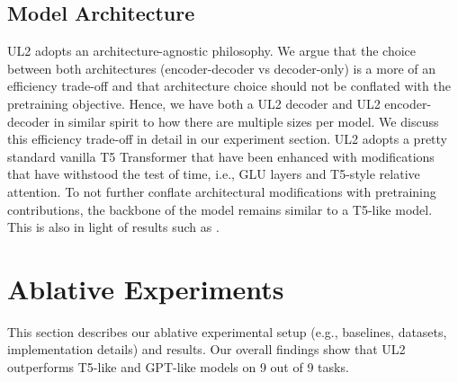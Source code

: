 \documentclass[10pt]{article}
\begin{document}
\subsection{Model Architecture}
UL2 adopts an architecture-agnostic philosophy. We argue that the choice between both architectures (encoder-decoder vs decoder-only) is a more of an efficiency trade-off and that architecture choice should not be conflated with the pretraining objective. Hence, we have both a UL2 decoder and UL2 encoder-decoder in similar spirit to how there are multiple sizes per model. We discuss this efficiency trade-off in detail in our experiment section. UL2 adopts a pretty standard vanilla T5 Transformer that have been enhanced with modifications that have withstood the test of time, i.e., GLU layers \citep{shazeer2020glu} and T5-style relative attention. To not further conflate architectural modifications with pretraining contributions, the backbone of the model remains similar to a T5-like model. This is also in light of results such as \citep{narang2021transformer}. 
 


\section{Ablative Experiments}
This section describes our ablative experimental setup (e.g., baselines, datasets, implementation details) and results. Our overall findings show that UL2 outperforms T5-like and GPT-like models on 9 out of 9 tasks.
\end{document}
